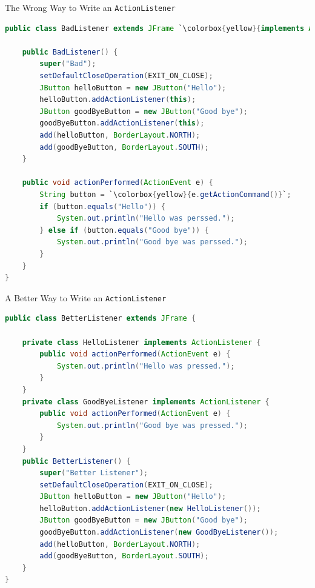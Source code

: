 \documentclass{beamer}
\begin{document}
\begin{frame}[fragile]{The Wrong Way to Write an {\tt ActionListener}}


\begin{lstlisting}[language=Java,escapechar=`]
public class BadListener extends JFrame `\colorbox{yellow}{implements ActionListener}` {

    public BadListener() {
        super("Bad");
        setDefaultCloseOperation(EXIT_ON_CLOSE);
        JButton helloButton = new JButton("Hello");
        helloButton.addActionListener(this);
        JButton goodByeButton = new JButton("Good bye");
        goodByeButton.addActionListener(this);
        add(helloButton, BorderLayout.NORTH);
        add(goodByeButton, BorderLayout.SOUTH);
    }

    public void actionPerformed(ActionEvent e) {
        String button = `\colorbox{yellow}{e.getActionCommand()}`;
        if (button.equals("Hello")) {
            System.out.println("Hello was perssed.");
        } else if (button.equals("Good bye")) {
            System.out.println("Good bye was perssed.");
        }
    }
}
\end{lstlisting}

\end{frame}

\begin{frame}[fragile]{A Better Way to Write an {\tt ActionListener}}

\vspace{-.1in}
\begin{lstlisting}[language=Java]
public class BetterListener extends JFrame {

    private class HelloListener implements ActionListener {
        public void actionPerformed(ActionEvent e) {
            System.out.println("Hello was pressed.");
        }
    }
    private class GoodByeListener implements ActionListener {
        public void actionPerformed(ActionEvent e) {
            System.out.println("Good bye was pressed.");
        }
    }
    public BetterListener() {
        super("Better Listener");
        setDefaultCloseOperation(EXIT_ON_CLOSE);
        JButton helloButton = new JButton("Hello");
        helloButton.addActionListener(new HelloListener());
        JButton goodByeButton = new JButton("Good bye");
        goodByeButton.addActionListener(new GoodByeListener());
        add(helloButton, BorderLayout.NORTH);
        add(goodByeButton, BorderLayout.SOUTH);
    }
}
\end{lstlisting}


\end{frame}
\end{document}
